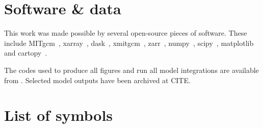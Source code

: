 \chapter*{Software \& data}
This work was made possible by several open-source pieces of software. These include MITgcm~\citep{MITgcm2022}, xarray~\citep{Hoyer2017}, dask~\citep{DaskDevelopmentTeam2016, Rocklin2015}, xmitgcm~\citep{Abernathey2021}, zarr~\citep{Miles2022}, numpy~\citep{Harris2020}, scipy~\citep{Virtanen2020}, matplotlib~\citep{Hunter2007} and cartopy~\citep{Elson2022}.

The codes used to produce all figures and run all model integrations are available from \citet{siV1p0, nbcV1p0, dwbcV1p1, irmingerV1p0}. Selected model outputs have been archived at CITE.

\chapter*{List of symbols}


